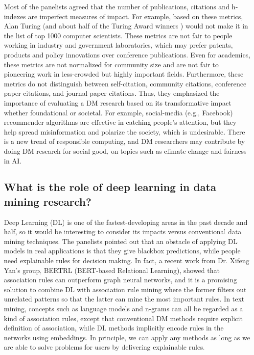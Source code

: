 \documentclass[11pt,dvipdfm]{article}
\begin{document}
Most of the panelists agreed that the number of publications, citations and h-indexes are imperfect measures of impact. For example, based on these metrics, Alan Turing (and about half of the Turing Award winners \cite{JinYTuringAwardElitesRevisited})
would not make it in the list of top 1000 computer scientists. These metrics are not fair to people working in industry and government laboratories, which may prefer patents, products and policy innovations over conference publications. Even for academics, these metrics are not normalized for community size and are not fair to pioneering work in less-crowded but highly important fields. Furthermore, these metrics do not distinguish between self-citation, community citations, conference paper citations, and journal paper citations. Thus, they emphasized the importance of evaluating a DM research based on its transformative impact whether foundational or societal. For example, social-media (e.g., Facebook) recommender algorithms are effective in catching people’s attention, but they help spread misinformation and polarize the society, which is undesirable. There is a new trend of responsible computing, and DM researchers may contribute by doing DM research for social good, on topics such as climate change and fairness in AI. 

\subsection{What is the role of deep learning in data mining research?}

Deep Learning (DL) is one of the fastest-developing areas in the past decade and half, so it would be interesting to consider its impacts versus conventional data mining techniques. The panelists pointed out that an obstacle of applying DL models in real applications is that they give blackbox predictions, while people need explainable rules for decision making. In fact, a recent work from Dr. Xifeng Yan’s group, BERTRL (BERT-based Relational Learning), showed that association rules can outperform graph neural networks, and it is a promising solution to combine DL with association rule mining where the former filters out unrelated patterns so that the latter can mine the most important rules. In text mining, concepts such as language models and n-grams can all be regarded as a kind of association rules, except that conventional DM methods require explicit definition of association, while DL methods implicitly encode rules in the networks using embeddings. In principle, we can apply any methods as long as we are able to solve problems for users by delivering explainable rules. 
\end{document}
